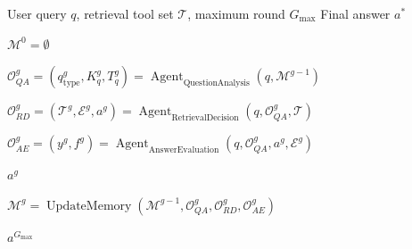 \begin{algorithm}[H]
\caption{Adaptive Multi-Agent Question Answering}
\label{algo:multi-agent-qa}
\small
\begin{algorithmic}[1]

\Require User query $q$, retrieval tool set $\mathcal{T}$, maximum round $G_{\max}$
\Ensure Final answer $a^{*}$

\State
$\mathcal{M}^{0}=\emptyset$


\State
$\mathcal{O}_{QA}^{g}
=
(q_{\mathrm{type}}^{g},K_q^{g},T_q^{g})
=
\operatorname{Agent}_{\mathrm{QuestionAnalysis}}
(q,\mathcal{M}^{g-1})$

\State
$\mathcal{O}_{RD}^{g}
=
(\mathcal{T}^{g},\mathcal{E}^{g},a^{g})
=
\operatorname{Agent}_{\mathrm{RetrievalDecision}}
(q,\mathcal{O}_{QA}^{g},\mathcal{T})$

\State
$\mathcal{O}_{AE}^{g}
=
(y^{g},f^{g})
=
\operatorname{Agent}_{\mathrm{AnswerEvaluation}}
(q,\mathcal{O}_{QA}^{g},a^{g},\mathcal{E}^{g})$

    \State \Return $a^{g}$
\EndIf

\State
$\mathcal{M}^{g}
=
\operatorname{UpdateMemory}
\left(
\mathcal{M}^{g-1},
\mathcal{O}_{QA}^{g},
\mathcal{O}_{RD}^{g},
\mathcal{O}_{AE}^{g}
\right)$

\EndFor

\State \Return $a^{G_{\max}}$

\end{algorithmic}
\end{algorithm}